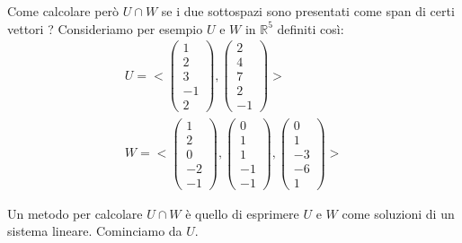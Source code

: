 Come calcolare per\`o $U \cap W$ se i due sottospazi sono presentati come span
di certi vettori ? Consideriamo per esempio $U$ e $W$ in $\mathbb{R}^5$
definiti cos\`i:
\begin{gather*}
	U = <\begin{pmatrix}
		1 \\ 2 \\ 3 \\ -1 \\ 2
	\end{pmatrix},
	\begin{pmatrix}
		2 \\ 4 \\ 7 \\ 2 \\ -1
	\end{pmatrix}> \\
	W = <\begin{pmatrix}
		1 \\ 2 \\ 0 \\ -2 \\ -1
	\end{pmatrix},
	\begin{pmatrix}
		0 \\ 1 \\ 1 \\ -1 \\ -1
	\end{pmatrix},
	\begin{pmatrix}
		0 \\ 1 \\ -3 \\ -6 \\ 1
	\end{pmatrix}>
\end{gather*}

Un metodo per calcolare $U \cap W$ \`e quello di esprimere $U$ e $W$ come
soluzioni di un sistema lineare. Cominciamo da $U$.

